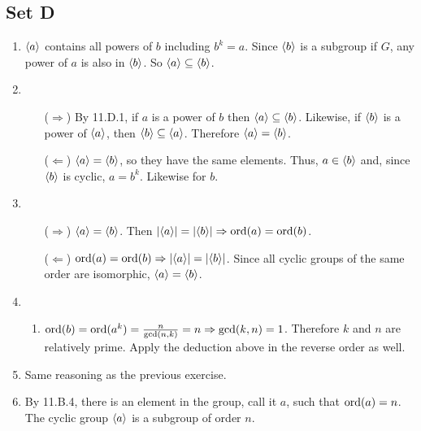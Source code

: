 \subsection{Set D}
\begin{enumerate}
    \item $\langle a\rangle$ contains all powers of $b$ including $b^k = a$. Since $\langle b\rangle$ is a subgroup if $G$, any power of $a$ is also in $\langle b\rangle$. So $\langle a\rangle \subseteq \langle b\rangle$.
    \item
    \begin{enumerate}
        \item [($\Rightarrow$)] By 11.D.1, if $a$ is a power of $b$ then $\langle a\rangle \subseteq \langle b\rangle$. Likewise, if $\langle b\rangle$ is a power of $\langle a\rangle$, then $\langle b\rangle \subseteq \langle a\rangle$. Therefore $\langle a\rangle = \langle b\rangle$.
        \item [($\Leftarrow$)] $\langle a\rangle = \langle b\rangle$, so they have the same elements. Thus, $a \in \langle b\rangle$ and, since $\langle b\rangle$ is cyclic, $a = b^k$. Likewise for $b$.
    \end{enumerate}

    \item 
    \begin{enumerate}
        \item [($\Rightarrow$)] $\langle a\rangle = \langle b\rangle$. Then $|\langle a\rangle| = |\langle b\rangle| \Rightarrow \operatorname{ord}(a) = \operatorname{ord}(b)$.
        \item [($\Leftarrow$)] $\operatorname{ord}(a) = \operatorname{ord}(b) \Rightarrow |\langle a\rangle| = |\langle b\rangle|$. Since all cyclic groups of the same order are isomorphic, $\langle a\rangle = \langle b\rangle$.
    \end{enumerate}

    \item 
    \begin{enumerate}
        \item $\operatorname{ord}(b) = \operatorname{ord}(a^k) = \frac{n}{\gcd(n, k)} = n \Rightarrow \gcd(k, n) = 1$. Therefore $k$ and $n$ are relatively prime. Apply the deduction above in the reverse order as well.
    \end{enumerate}

    \item Same reasoning as the previous exercise.
    
    \item By 11.B.4, there is an element in the group, call it $a$, such that $\operatorname{ord}(a) = n$. The cyclic group $\langle a\rangle$ is a subgroup of order $n$.
\end{enumerate}

